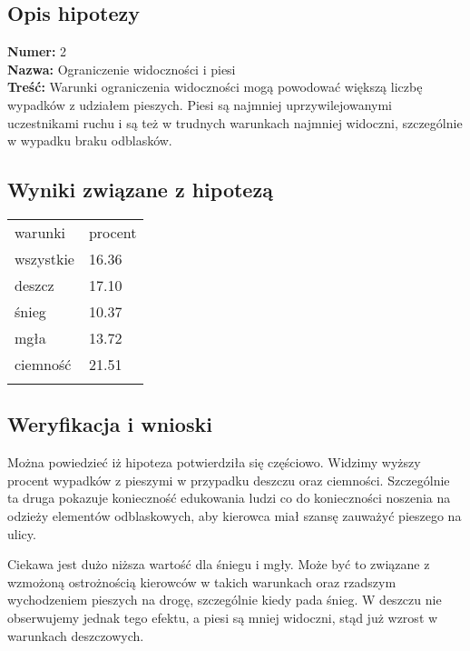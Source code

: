 \subsection{Opis hipotezy}\label{opis-hipotezy}

\textbf{Numer:} 2\\\textbf{Nazwa:} Ograniczenie widoczności i
piesi\\\textbf{Treść:} Warunki ograniczenia widoczności mogą powodować
większą liczbę wypadków z udziałem pieszych. Piesi są najmniej
uprzywilejowanymi uczestnikami ruchu i są też w trudnych warunkach
najmniej widoczni, szczególnie w wypadku braku odblasków.

\subsection{Wyniki związane z
hipotezą}\label{wyniki-zwiazane-z-hipoteza}

\begin{longtable}[c]{@{}ll@{}}
\toprule\addlinespace
warunki & procent
\\\addlinespace
\midrule\endhead
wszystkie & 16.36
\\\addlinespace
deszcz & 17.10
\\\addlinespace
śnieg & 10.37
\\\addlinespace
mgła & 13.72
\\\addlinespace
ciemność & 21.51
\\\addlinespace
\bottomrule
\end{longtable}

\subsection{Weryfikacja i wnioski}\label{weryfikacja-i-wnioski}

Można powiedzieć iż hipoteza potwierdziła się częściowo. Widzimy wyższy
procent wypadków z pieszymi w przypadku deszczu oraz ciemności.
Szczególnie ta druga pokazuje konieczność edukowania ludzi co do
konieczności noszenia na odzieży elementów odblaskowych, aby kierowca
miał szansę zauważyć pieszego na ulicy.

Ciekawa jest dużo niższa wartość dla śniegu i mgły. Może być to związane
z wzmożoną ostrożnością kierowców w takich warunkach oraz rzadszym
wychodzeniem pieszych na drogę, szczególnie kiedy pada śnieg. W deszczu
nie obserwujemy jednak tego efektu, a piesi są mniej widoczni, stąd już
wzrost w warunkach deszczowych.
